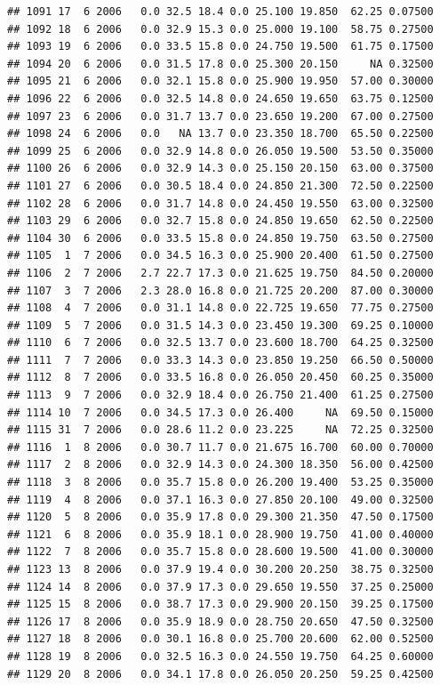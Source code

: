 \documentclass[
]{book}
\begin{document}
\begin{verbatim}
## 1091 17  6 2006   0.0 32.5 18.4 0.0 25.100 19.850  62.25 0.07500
## 1092 18  6 2006   0.0 32.9 15.3 0.0 25.000 19.100  58.75 0.27500
## 1093 19  6 2006   0.0 33.5 15.8 0.0 24.750 19.500  61.75 0.17500
## 1094 20  6 2006   0.0 31.5 17.8 0.0 25.300 20.150     NA 0.32500
## 1095 21  6 2006   0.0 32.1 15.8 0.0 25.900 19.950  57.00 0.30000
## 1096 22  6 2006   0.0 32.5 14.8 0.0 24.650 19.650  63.75 0.12500
## 1097 23  6 2006   0.0 31.7 13.7 0.0 23.650 19.200  67.00 0.27500
## 1098 24  6 2006   0.0   NA 13.7 0.0 23.350 18.700  65.50 0.22500
## 1099 25  6 2006   0.0 32.9 14.8 0.0 26.050 19.500  53.50 0.35000
## 1100 26  6 2006   0.0 32.9 14.3 0.0 25.150 20.150  63.00 0.37500
## 1101 27  6 2006   0.0 30.5 18.4 0.0 24.850 21.300  72.50 0.22500
## 1102 28  6 2006   0.0 31.7 14.8 0.0 24.450 19.550  63.00 0.32500
## 1103 29  6 2006   0.0 32.7 15.8 0.0 24.850 19.650  62.50 0.22500
## 1104 30  6 2006   0.0 33.5 15.8 0.0 24.850 19.750  63.50 0.27500
## 1105  1  7 2006   0.0 34.5 16.3 0.0 25.900 20.400  61.50 0.27500
## 1106  2  7 2006   2.7 22.7 17.3 0.0 21.625 19.750  84.50 0.20000
## 1107  3  7 2006   2.3 28.0 16.8 0.0 21.725 20.200  87.00 0.30000
## 1108  4  7 2006   0.0 31.1 14.8 0.0 22.725 19.650  77.75 0.27500
## 1109  5  7 2006   0.0 31.5 14.3 0.0 23.450 19.300  69.25 0.10000
## 1110  6  7 2006   0.0 32.5 13.7 0.0 23.600 18.700  64.25 0.32500
## 1111  7  7 2006   0.0 33.3 14.3 0.0 23.850 19.250  66.50 0.50000
## 1112  8  7 2006   0.0 33.5 16.8 0.0 26.050 20.450  60.25 0.35000
## 1113  9  7 2006   0.0 32.9 18.4 0.0 26.750 21.400  61.25 0.27500
## 1114 10  7 2006   0.0 34.5 17.3 0.0 26.400     NA  69.50 0.15000
## 1115 31  7 2006   0.0 28.6 11.2 0.0 23.225     NA  72.25 0.32500
## 1116  1  8 2006   0.0 30.7 11.7 0.0 21.675 16.700  60.00 0.70000
## 1117  2  8 2006   0.0 32.9 14.3 0.0 24.300 18.350  56.00 0.42500
## 1118  3  8 2006   0.0 35.7 15.8 0.0 26.200 19.400  53.25 0.35000
## 1119  4  8 2006   0.0 37.1 16.3 0.0 27.850 20.100  49.00 0.32500
## 1120  5  8 2006   0.0 35.9 17.8 0.0 29.300 21.350  47.50 0.17500
## 1121  6  8 2006   0.0 35.9 18.1 0.0 28.900 19.750  41.00 0.40000
## 1122  7  8 2006   0.0 35.7 15.8 0.0 28.600 19.500  41.00 0.30000
## 1123 13  8 2006   0.0 37.9 19.4 0.0 30.200 20.250  38.75 0.32500
## 1124 14  8 2006   0.0 37.9 17.3 0.0 29.650 19.550  37.25 0.25000
## 1125 15  8 2006   0.0 38.7 17.3 0.0 29.900 20.150  39.25 0.17500
## 1126 17  8 2006   0.0 35.9 18.9 0.0 28.750 20.650  47.50 0.32500
## 1127 18  8 2006   0.0 30.1 16.8 0.0 25.700 20.600  62.00 0.52500
## 1128 19  8 2006   0.0 32.5 16.3 0.0 24.550 19.750  64.25 0.60000
## 1129 20  8 2006   0.0 34.1 17.8 0.0 26.050 20.250  59.25 0.42500

\end{verbatim}
\end{document}
